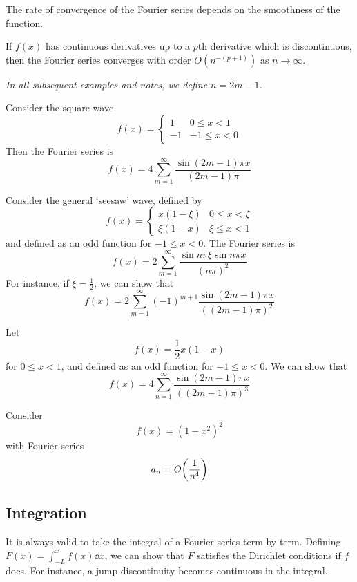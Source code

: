\noindent The rate of convergence of the Fourier series depends on the smoothness of the function.
\begin{theorem}
	If \( f(x) \) has continuous derivatives up to a \( p \)th derivative which is discontinuous, then the Fourier series converges with order \( O(n^{-(p+1)}) \) as \( n \to \infty \).
\end{theorem}
\noindent \textit{In all subsequent examples and notes, we define \( n = 2m - 1 \).}
\begin{example}[\( p = 0 \)]
	Consider the square wave
	\[
		f(x) = \begin{cases}
			1  & 0 \leq x < 1  \\
			-1 & -1 \leq x < 0
		\end{cases}
	\]
	Then the Fourier series is
	\[
		f(x) = 4 \sum_{m=1}^\infty \frac{\sin (2m-1)\pi x}{(2m-1)\pi}
	\]
\end{example}
\begin{example}[\( p = 1 \)]
	Consider the general `seesaw' wave, defined by
	\[
		f(x) = \begin{cases}
			x(1 - \xi) & 0 \leq x < \xi \\
			\xi(1 - x) & \xi \leq x < 1
		\end{cases}
	\]
	and defined as an odd function for \( -1 \leq x < 0 \).
	The Fourier series is
	\[
		f(x) = 2 \sum_{m=1}^\infty \frac{\sin n\pi \xi \sin n\pi x}{(n \pi)^2}
	\]
	For instance, if \( \xi = \frac{1}{2} \), we can show that
	\[
		f(x) = 2 \sum_{m=1}^\infty (-1)^{m+1} \frac{\sin (2m-1)\pi x}{((2m-1)\pi)^2}
	\]
\end{example}
\begin{example}[\( p = 2 \)]
	Let
	\[
		f(x) = \frac{1}{2} x(1-x)
	\]
	for \( 0 \leq x < 1 \), and defined as an odd function for \( -1 \leq x < 0 \).
	We can show that
	\[
		f(x) = 4\sum_{n=1}^\infty \frac{\sin(2m - 1)\pi x}{((2m-1)\pi)^3}
	\]
\end{example}
\begin{example}[\( p = 3 \)]
	Consider
	\[
		f(x) = (1-x^2)^2
	\]
	with Fourier series
	\[
		a_n = O\qty(\frac{1}{n^4})
	\]
\end{example}

\subsection{Integration}
It is always valid to take the integral of a Fourier series term by term.
Defining \( F(x) = \int_{-L}^x f(x) \dd{x} \), we can show that \( F \) satisfies the Dirichlet conditions if \( f \) does.
For instance, a jump discontinuity becomes continuous in the integral.

